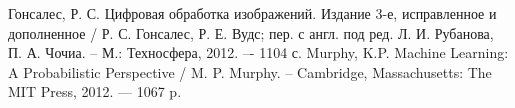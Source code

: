 \documentclass[main.tex]{subfiles}
\begin{document}
	\begin{thebibliography}{99}
		
		 Гонсалес, Р. С. Цифровая обработка изображений. Издание 3-е, исправленное и дополненное / Р. С. Гонсалес, Р. Е. Вудс; пер. с англ. под ред. Л. И. Рубанова, П. А. Чочиа. -- М.: Техносфера, 2012. –- 1104 с.
		 Murphy, K.P. Machine Learning: A Probabilistic Perspective / M. P. Murphy. -- Cambridge, Massachusetts: The MIT Press, 2012. — 1067 p.
	\end{thebibliography}
\end{document}
